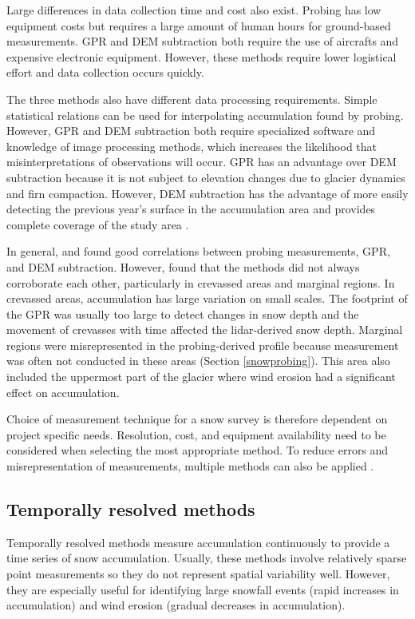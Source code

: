 \documentclass[12pt]{article}
\begin{document}
Large differences in data collection time and cost also exist. Probing has low equipment costs but requires a large amount of human hours for ground-based measurements. GPR and DEM subtraction both require the use of aircrafts and expensive electronic equipment. However, these methods require lower logistical effort and data collection occurs quickly.  

The three methods also have different data processing requirements. Simple statistical relations can be used for interpolating accumulation found by probing. However, GPR and DEM subtraction both require specialized software and knowledge of image processing methods, which increases the likelihood that misinterpretations of observations will occur. GPR has an advantage over DEM subtraction because it is not subject to elevation changes due to glacier dynamics and firn compaction. However, DEM subtraction has the advantage of more easily detecting the previous year's surface in the accumulation area and provides complete coverage of the study area \citep{Sold2013}. 

In general, \cite{Machguth2006} and \cite{Sold2013} found good correlations between probing measurements, GPR, and DEM subtraction. However, \citep{Sold2013} found that the methods did not always corroborate each other, particularly in crevassed areas and marginal regions. In crevassed areas, accumulation has large variation on small scales. The footprint of the GPR was usually too large to detect changes in snow depth and the movement of crevasses with time affected the lidar-derived snow depth. Marginal regions were misrepresented in the probing-derived profile because measurement was often not conducted in these areas (Section \ref{snowprobing}). This area also included the uppermost part of the glacier where wind erosion had a significant effect on accumulation. 

Choice of measurement technique for a snow survey is therefore dependent on project specific needs. Resolution, cost, and equipment availability need to be considered when selecting the most appropriate method. To reduce errors and misrepresentation of measurements, multiple methods can also be applied \citep{Machguth2006}. 

\subsection{Temporally resolved methods}
Temporally resolved methods measure accumulation continuously to provide a time series of snow accumulation. Usually, these methods involve relatively sparse point measurements so they do not represent spatial variability well. However, they are especially useful for identifying large snowfall events (rapid increases in accumulation) and wind erosion (gradual decreases in accumulation). 
\end{document}
